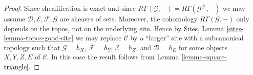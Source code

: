 \documentclass[10pt,a4paper]{amsart}
\theoremstyle{plain}
\theoremstyle{definition}
\theoremstyle{remark}
\numberwithin{equation}{subsection}
\begin{document}
\begin{proof}
Since sheafification is exact and since
$R\Gamma(\mathcal{G}, -) = R\Gamma(\mathcal{G}^\#, -)$
we may assume $\mathcal{D}, \mathcal{E}, \mathcal{F}, \mathcal{G}$
are sheaves of sets. Moreover, the cohomology
$R\Gamma(\mathcal{G}, -)$ only depends on the topos,
not on the underlying site. Hence by
Sites, Lemma \ref{sites-lemma-topos-good-site}
we may replace $\mathcal{C}$ by a ``larger'' site
with a subcanonical topology such that $\mathcal{G} = h_X$,
$\mathcal{F} = h_Y$,
$\mathcal{E} = h_Z$, and
$\mathcal{D} = h_E$
for some objects $X, Y, Z, E$ of $\mathcal{C}$.
In this case the result follows from
Lemma \ref{lemma-square-triangle}.
\end{proof}
\end{document}
